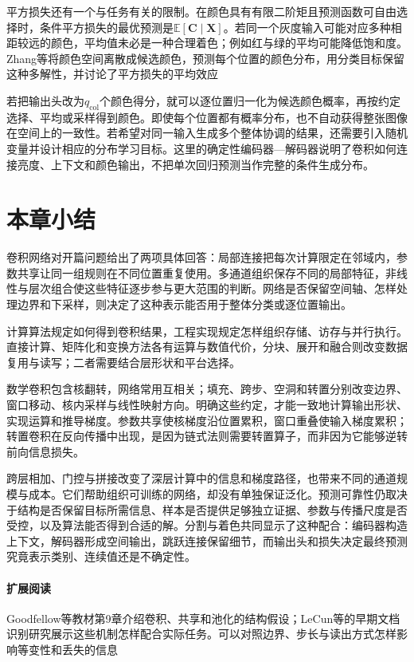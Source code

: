 平方损失还有一个与任务有关的限制。在颜色具有有限二阶矩且预测函数可自由选择时，条件平方损失的最优预测是$\mathbb E[\bm C\mid\bm X]$。若同一个灰度输入可能对应多种相距较远的颜色，平均值未必是一种合理着色；例如红与绿的平均可能降低饱和度。Zhang等将颜色空间离散成候选颜色，预测每个位置的颜色分布，用分类目标保留这种多解性，并讨论了平方损失的平均效应

若把输出头改为$q_{\mathrm{col}}$个颜色得分，就可以逐位置归一化为候选颜色概率，再按约定选择、平均或采样得到颜色。即使每个位置都有概率分布，也不自动获得整张图像在空间上的一致性。若希望对同一输入生成多个整体协调的结果，还需要引入随机变量并设计相应的分布学习目标。这里的确定性编码器—解码器说明了卷积如何连接亮度、上下文和颜色输出，不把单次回归预测当作完整的条件生成分布。

\section{本章小结}
\label{sec:cnn-summary}

卷积网络对开篇问题给出了两项具体回答：局部连接把每次计算限定在邻域内，参数共享让同一组规则在不同位置重复使用。多通道组织保存不同的局部特征，非线性与层次组合使这些特征逐步参与更大范围的判断。网络是否保留空间轴、怎样处理边界和下采样，则决定了这种表示能否用于整体分类或逐位置输出。

计算算法规定如何得到卷积结果，工程实现规定怎样组织存储、访存与并行执行。直接计算、矩阵化和变换方法各有运算与数值代价，分块、展开和融合则改变数据复用与读写；二者需要结合层形状和平台选择。

数学卷积包含核翻转，网络常用互相关；填充、跨步、空洞和转置分别改变边界、窗口移动、核内采样与线性映射方向。明确这些约定，才能一致地计算输出形状、实现运算和推导梯度。参数共享使核梯度沿位置累积，窗口重叠使输入梯度累积；转置卷积在反向传播中出现，是因为链式法则需要转置算子，而非因为它能够逆转前向信息损失。

跨层相加、门控与拼接改变了深层计算中的信息和梯度路径，也带来不同的通道规模与成本。它们帮助组织可训练的网络，却没有单独保证泛化。预测可靠性仍取决于结构是否保留目标所需信息、样本是否提供足够独立证据、参数与传播尺度是否受控，以及算法能否得到合适的解。分割与着色共同显示了这种配合：编码器构造上下文，解码器形成空间输出，跳跃连接保留细节，而输出头和损失决定最终预测究竟表示类别、连续值还是不确定性。

\paragraph{扩展阅读}
Goodfellow等教材第9章介绍卷积、共享和池化的结构假设；LeCun等的早期文档识别研究展示这些机制怎样配合实际任务。可以对照边界、步长与读出方式怎样影响等变性和丢失的信息
